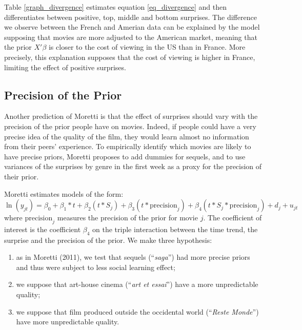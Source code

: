  Table \ref{graph_divergence} estimates equation \ref{eq_divergence} and then differentiates between positive, top, middle and bottom surprises. 
The difference we observe between the French and Amerian data can be explained by the model supposing that movies are more adjusted to the American market, meaning that the prior $X'\beta$ is closer to the cost of viewing in the US than in France. More precisely, this explanation supposes that the cost of viewing is higher in France, limiting the effect of positive surprises.

\subsection{Precision of the Prior}\label{subsec2.3}
Another prediction of Moretti is that the effect of surprises should vary with the precision of the prior people have on movies. Indeed, if people could have a very precise idea of the quality of the film, they would learn almost no information from their peers' experience. To empirically identify which movies are likely to have precise priors, Moretti proposes to add dummies for sequels, and to use variances of the surprises by genre in the first week as a proxy for the precision of their prior. 

Moretti estimates models of the form: \begin{equation}\label{key}
	\ln(y_{jt})=\beta_0+\beta_1*t+\beta_2(t*S_j)+\beta_3(t*\text{precision}_j)+\beta_4(t*S_j*\text{precision}_j) +d_j+u_{jt}
\end{equation}
where $\text{precision}_j$ measures the precision of the prior for movie $j$. The coefficient of interest is the coefficient $\beta_4$ on the triple interaction between the time trend, the surprise and the precision of the prior. We make three hypothesis: 
\begin{enumerate}
	\item as in Moretti (2011), we test that sequels (``\textit{saga}'') had more precise priors and thus were subject to less social learning effect;
	\item we suppose that art-house cinema (``\textit{art et essai}'') have a more unpredictable quality;
	\item we suppose that film produced outside the occidental world (``\textit{Reste Monde}'') have more unpredictable quality.
\end{enumerate}

